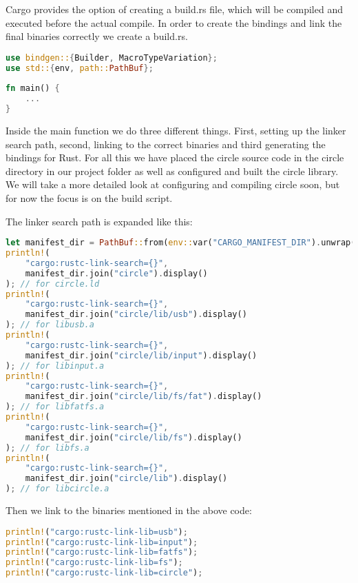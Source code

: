 Cargo provides the option of creating a build.rs file, which will be compiled and executed before the actual compile.
In order to create the bindings and link the final binaries correctly we create a build.rs.
\begin{lstlisting}[language=Rust,style=colouredRust]
use bindgen::{Builder, MacroTypeVariation};
use std::{env, path::PathBuf};
    
fn main() {
    ...
}    
\end{lstlisting}

Inside the main function we do three different things.
First, setting up the linker search path, second, linking to the correct binaries and third generating the bindings for Rust.
For all this we have placed the circle source code in the circle directory in our project folder as well as configured and built the circle library.
We will take a more detailed look at configuring and compiling circle soon, but for now the focus is on the build script.

The linker search path is expanded like this:
\begin{lstlisting}[language=Rust,style=colouredRust]
let manifest_dir = PathBuf::from(env::var("CARGO_MANIFEST_DIR").unwrap());
println!(
    "cargo:rustc-link-search={}",
    manifest_dir.join("circle").display()
); // for circle.ld
println!(
    "cargo:rustc-link-search={}",
    manifest_dir.join("circle/lib/usb").display()
); // for libusb.a
println!(
    "cargo:rustc-link-search={}",
    manifest_dir.join("circle/lib/input").display()
); // for libinput.a
println!(
    "cargo:rustc-link-search={}",
    manifest_dir.join("circle/lib/fs/fat").display()
); // for libfatfs.a
println!(
    "cargo:rustc-link-search={}",
    manifest_dir.join("circle/lib/fs").display()
); // for libfs.a
println!(
    "cargo:rustc-link-search={}",
    manifest_dir.join("circle/lib").display()
); // for libcircle.a
\end{lstlisting}

Then we link to the binaries mentioned in the above code:
\begin{lstlisting}[language=Rust,style=colouredRust]
println!("cargo:rustc-link-lib=usb");
println!("cargo:rustc-link-lib=input");
println!("cargo:rustc-link-lib=fatfs");
println!("cargo:rustc-link-lib=fs");
println!("cargo:rustc-link-lib=circle");
\end{lstlisting}

